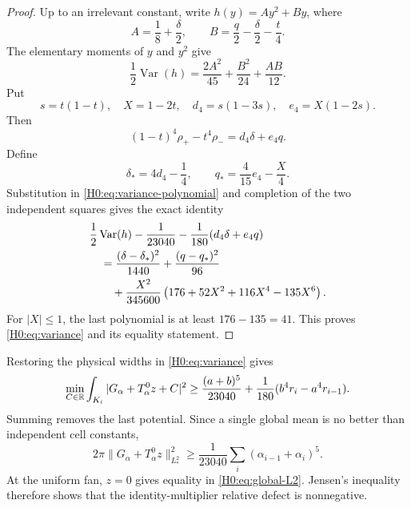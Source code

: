 \begin{proof}
Up to an irrelevant constant, write $h(y)=Ay^2+By$, where
\begin{equation}
 A=\frac18+\frac\delta2,
 \qquad B=\frac q2-\frac\delta2-\frac t4.
\end{equation}
The elementary moments of $y$ and $y^2$ give
\begin{equation}\label{H0:eq:variance-polynomial}
 \frac12\operatorname {Var}(h)
 =\frac{2A^2}{45}+\frac{B^2}{24}+\frac{AB}{12}.
\end{equation}
Put
\begin{equation}
 s=t(1-t),\quad X=1-2t,\quad
 d_4=s(1-3s),\quad e_4=X(1-2s).
\end{equation}
Then
\begin{equation}
 (1-t)^4\rho_+-t^4\rho_-=d_4\delta+e_4q.
\end{equation}
Define
\begin{equation}
 \delta_*=4d_4-\frac14,
 \qquad q_*=\frac4{15}e_4-\frac X4.
\end{equation}
Substitution in \eqref{H0:eq:variance-polynomial} and completion of the two
independent squares gives the exact identity
\begin{align}
 &\frac12\operatorname {Var}(h)-\frac1{23040}
 -\frac1{180}(d_4\delta+e_4q)\notag\\
 &\quad=\frac{(\delta-\delta_*)^2}{1440}
 +\frac{(q-q_*)^2}{96}\notag\\
 &\qquad+\frac{X^2}{345600}
 \left(176+52X^2+116X^4-135X^6\right).
 \label{H0:eq:variance-squares}
\end{align}
For $|X|\le1$, the last polynomial is at least
$176-135=41$.  This proves \eqref{H0:eq:variance} and its equality statement.
\end{proof}

Restoring the physical widths in \eqref{H0:eq:variance} gives
\begin{equation}\label{H0:eq:physical-variance}
 \min_{C\in\mathbb R}\int_{K_i}
 |G_\alpha+T_\alpha^0z+C|^2
 \ge\frac{(a+b)^5}{23040}
 +\frac1{180}(b^4r_i-a^4r_{i-1}).
\end{equation}
Summing removes the last potential.  Since a single global mean is no better
than independent cell constants,
\begin{equation}\label{H0:eq:global-L2}
 2\pi\|G_\alpha+T_\alpha^0z\|_{L_*^2}^2
 \ge\frac1{23040}\sum_i(\alpha_{i-1}+\alpha_i)^5.
\end{equation}
At the uniform fan, $z=0$ gives equality in \eqref{H0:eq:global-L2}.  Jensen's
inequality therefore shows that the identity-multiplier relative defect is
nonnegative.

